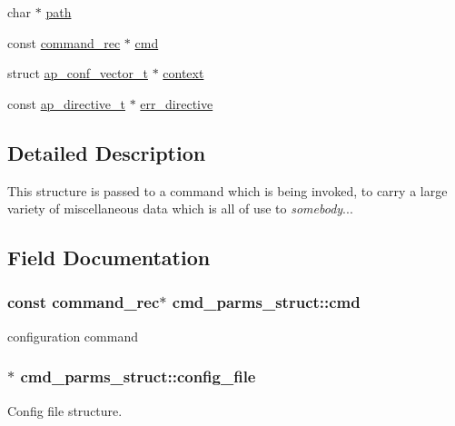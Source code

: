 \begin{DoxyCompactItemize}
\item 
char $\ast$ \hyperlink{structcmd__parms__struct_ae91b816d1328294b32b801f357f4c13a}{path}
\item 
const \hyperlink{group__APACHE__CORE__CONFIG_ga79f84e70f072880482a3fd004ae48710}{command\+\_\+rec} $\ast$ \hyperlink{structcmd__parms__struct_accc10382e4297173d29e79b22d2d61bc}{cmd}
\item 
struct \hyperlink{group__APACHE__CORE__CONFIG_ga614684670dbf748a70ac6bad272da59c}{ap\+\_\+conf\+\_\+vector\+\_\+t} $\ast$ \hyperlink{structcmd__parms__struct_afc46a84ba3c87041021ec262910560b9}{context}
\item 
const \hyperlink{structap__directive__t}{ap\+\_\+directive\+\_\+t} $\ast$ \hyperlink{structcmd__parms__struct_a9a6a6933d1f49e1ec3761a0caaa96090}{err\+\_\+directive}
\end{DoxyCompactItemize}


\subsection{Detailed Description}
This structure is passed to a command which is being invoked, to carry a large variety of miscellaneous data which is all of use to {\itshape somebody}... 

\subsection{Field Documentation}
\subsubsection[{\texorpdfstring{cmd}{cmd}}]{\setlength{\rightskip}{0pt plus 5cm}const {\bf command\+\_\+rec}$\ast$ cmd\+\_\+parms\+\_\+struct\+::cmd}\hypertarget{structcmd__parms__struct_accc10382e4297173d29e79b22d2d61bc}{}\label{structcmd__parms__struct_accc10382e4297173d29e79b22d2d61bc}
configuration command 
\subsubsection[{\texorpdfstring{config\+\_\+file}{config_file}}]{$\ast$ cmd\+\_\+parms\+\_\+struct\+::config\+\_\+file}\hypertarget{structcmd__parms__struct_aad11bde08020eb1db63c2a8b4d4cbf2f}{}\label{structcmd__parms__struct_aad11bde08020eb1db63c2a8b4d4cbf2f}
Config file structure. 

